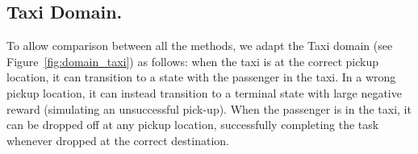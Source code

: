 

\subsection{Taxi Domain.}
To allow comparison between all the methods, we adapt the Taxi domain (see Figure~\ref{fig:domain_taxi}) as follows: when the taxi is at the correct pickup location, it can transition to a state with the passenger in the taxi.
In a wrong pickup location, it can instead transition to a terminal state with large negative reward (simulating an unsuccessful pick-up).
When the passenger is in the taxi, it can be dropped off at any pickup location, successfully completing the task whenever dropped at the correct destination.

